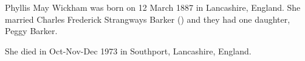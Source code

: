 
Phyllis May Wickham was born on 12 March 1887 in Lancashire, England.  She married Charles Frederick Strangways Barker () and they had one daughter, Peggy Barker.  

She died in Oct-Nov-Dec 1973 in Southport, Lancashire, England.\cite{PhyllisWickhamDeath}
